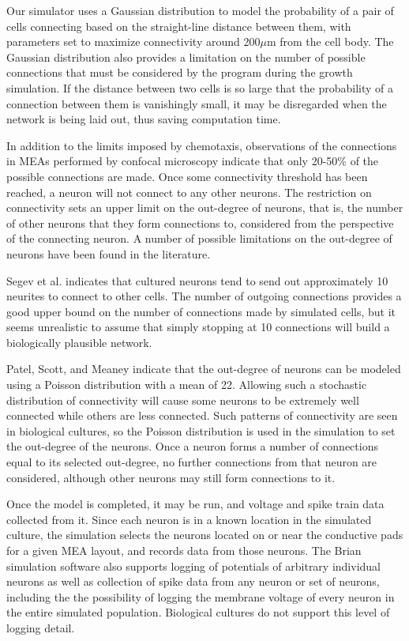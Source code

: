 \documentclass[letterpaper]{article}
\begin{document}
Our simulator uses a Gaussian distribution to model the probability of a pair of cells connecting based on the straight-line distance between them, with parameters set to maximize connectivity around 200$\mu$m from the cell body. 
The Gaussian distribution also provides a limitation on the number of possible connections that must be considered by the program during the growth simulation. 
If the distance between two cells is so large that the probability of a connection between them is vanishingly small, it may be disregarded when the network is being laid out, thus saving computation time. 

In addition to the limits imposed by chemotaxis, observations of the connections in MEAs performed by confocal microscopy indicate that only 20-50\% of the possible connections are made. 
Once some connectivity threshold has been reached, a neuron will not connect to any other neurons. 
The restriction on connectivity sets an upper limit on the out-degree of neurons, that is, the number of other neurons that they form connections to, considered from the perspective of the connecting neuron. 
A number of possible limitations on the out-degree of neurons have been found in the literature.  

Segev et al. \citeyear{segev2003formation} indicates that cultured neurons tend to send out approximately 10 neurites to connect to other cells. 
The number of outgoing connections provides a good upper bound on the number of connections made by simulated cells, but it seems unrealistic to assume that simply stopping at 10 connections will build a biologically plausible network.

Patel, Scott, and Meaney \citeyear{patel2012dynamic} indicate that the out-degree of neurons can be modeled using a Poisson distribution with a mean of 22. 
Allowing such a stochastic distribution of connectivity will cause some neurons to be extremely well connected while others are less connected. 
Such patterns of connectivity are seen in biological cultures, so the Poisson distribution is used in the simulation to set the out-degree of the neurons. 
Once a neuron forms a number of connections equal to its selected out-degree, no further connections from that neuron are considered, although other neurons may still form connections to it. 

Once the model is completed, it may be run, and voltage and spike train data collected from it. 
Since each neuron is in a known location in the simulated culture, the simulation selects the neurons located on or near the conductive pads for a given MEA layout, and records data from those neurons. 
The Brian simulation software also supports logging of potentials of arbitrary individual neurons as well as collection of spike data from any neuron or set of neurons, including the the possibility of logging the membrane voltage of every neuron in the entire simulated population.
Biological cultures do not support this level of logging detail.  
\end{document}
